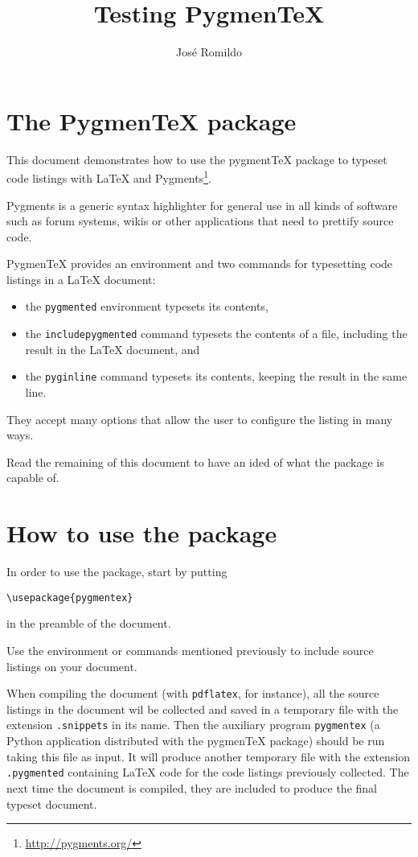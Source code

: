 \documentclass[12pt]{article}
\begin{document}
\title{Testing Pygmen\TeX}
\author{José Romildo}
\maketitle

\section{The Pygmen\TeX{} package}

This document demonstrates how to use the pygment\TeX{} package to typeset
code listings with \LaTeX{} and
Pygments\footnote{\url{http://pygments.org/}}.

Pygments is a generic syntax highlighter for general use in all kinds of
software such as forum systems, wikis or other applications that need to
prettify source code.

Pygmen\TeX{} provides an environment and two commands for typesetting code
listings in a \LaTeX{} document:
\begin{itemize}
  \item the \texttt{pygmented} environment typesets its contents,
  \item the \texttt{includepygmented} command typesets the contents of a
  file, including the result in the \LaTeX{} document, and
  \item the \texttt{pyginline} command typesets its contents, keeping
  the result in the same line.
\end{itemize}
They accept many options that allow the user to configure the listing in
many ways.

Read the remaining of this document to have an ided of what the package
is capable of.

\section{How to use the package}

In order to use the package, start by putting
\begin{verbatim}
\usepackage{pygmentex}
\end{verbatim}
in the preamble of the document.

Use the environment or commands mentioned previously to include source
listings on your document.

When compiling the document (with \texttt{pdflatex}, for instance), all
the source listings in the document wil be collected and saved in a
temporary file with the extension \texttt{.snippets} in its name. Then
the auxiliary program \texttt{pygmentex} (a Python application
distributed with the pygmen\TeX{} package) should be run taking this
file as input. It will produce another temporary file with the extension
\texttt{.pygmented} containing \LaTeX{} code for the code listings
previously collected. The next time the document is compiled, they are
included to produce the final typeset document.
\end{document}

